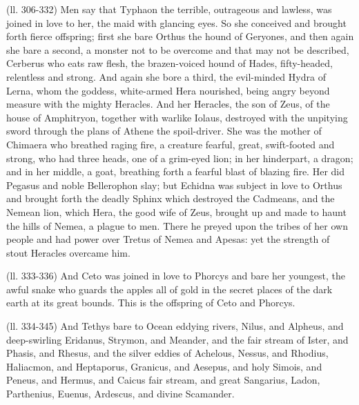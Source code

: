 (ll. 306-332) Men say that Typhaon the terrible, outrageous and lawless, was
joined in love to her, the maid with glancing eyes. So she conceived and
brought forth fierce offspring; first she bare Orthus the hound of Geryones,
and then again she bare a second, a monster not to be overcome and that may not
be described, Cerberus who eats raw flesh, the brazen-voiced hound of Hades,
fifty-headed, relentless and strong. And again she bore a third, the
evil-minded Hydra of Lerna, whom the goddess, white-armed Hera nourished, being
angry beyond measure with the mighty Heracles. And her Heracles, the son of
Zeus, of the house of Amphitryon, together with warlike Iolaus, destroyed with
the unpitying sword through the plans of Athene the spoil-driver. She was the
mother of Chimaera who breathed raging fire, a creature fearful, great,
swift-footed and strong, who had three heads, one of a grim-eyed lion; in her
hinderpart, a dragon; and in her middle, a goat, breathing forth a fearful
blast of blazing fire. Her did Pegasus and noble Bellerophon slay; but Echidna
was subject in love to Orthus and brought forth the deadly Sphinx which
destroyed the Cadmeans, and the Nemean lion, which Hera, the good wife of Zeus,
brought up and made to haunt the hills of Nemea, a plague to men. There he
preyed upon the tribes of her own people and had power over Tretus of Nemea and
Apesas: yet the strength of stout Heracles overcame him.

(ll. 333-336) And Ceto was joined in love to Phorcys and bare her youngest, the
awful snake who guards the apples all of gold in the secret places of the dark
earth at its great bounds. This is the offspring of Ceto and Phorcys.

(ll. 334-345) And Tethys bare to Ocean eddying rivers, Nilus, and Alpheus, and
deep-swirling Eridanus, Strymon, and Meander, and the fair stream of Ister, and
Phasis, and Rhesus, and the silver eddies of Achelous, Nessus, and Rhodius,
Haliacmon, and Heptaporus, Granicus, and Aesepus, and holy Simois, and Peneus,
and Hermus, and Caicus fair stream, and great Sangarius, Ladon, Parthenius,
Euenus, Ardescus, and divine Scamander.

